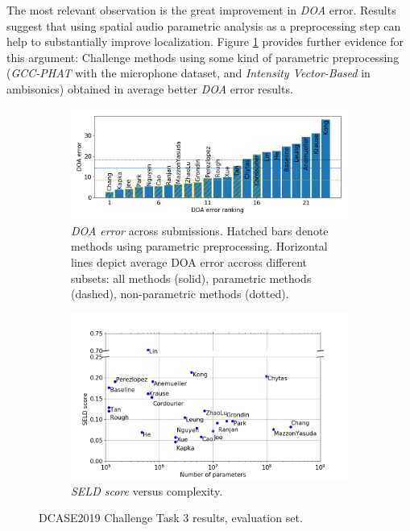 The most relevant observation is the great improvement in \textit{DOA} error. Results suggest that using spatial audio parametric analysis as a preprocessing step can help to substantially improve localization. 
Figure \ref{fig:5a} provides further evidence for this argument: Challenge methods using some kind of parametric preprocessing (\textit{GCC-PHAT} with the microphone dataset, and \textit{Intensity Vector-Based} in ambisonics) obtained in average better \textit{DOA} error results. \\

\begin{figure}
  \begin{subfigure}[b]{\textwidth}
    \includegraphics[width=\textwidth]{Figures/SELD//doaerror2.jpg}
    \caption{\textit{DOA error} across submissions. Hatched bars denote methods using parametric preprocessing. Horizontal lines depict average DOA error accross different subsets: all methods (solid), parametric methods (dashed), non-parametric methods (dotted).}
    \label{fig:5a}
  \end{subfigure}
  \begin{subfigure}[b]{\textwidth}
    \includegraphics[width=\textwidth]{Figures/SELD//complexity_vs_seld2.jpg}
    \caption{\textit{SELD score} versus complexity.}
    \label{fig:5b}
  \end{subfigure}
\caption{DCASE2019 Challenge Task 3 results, evaluation set.}
\end{figure}

